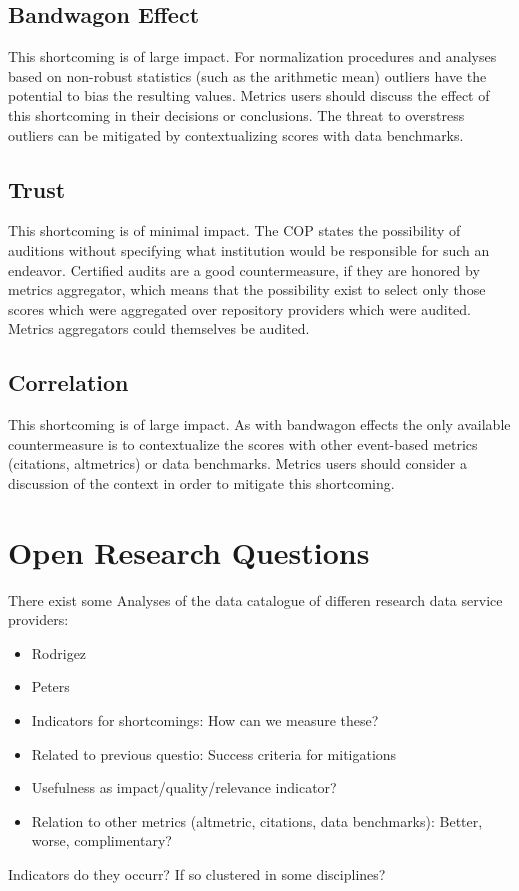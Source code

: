 \documentclass[conference, a4paper]{IEEEtran}\usepackage[]{graphicx}\usepackage[]{color}
\begin{document}
\subsection{Bandwagon Effect}
This shortcoming is of large impact.
For normalization procedures and analyses based on non-robust statistics
(such as the arithmetic mean) outliers have the potential to bias the resulting values.
Metrics users should discuss the effect of this shortcoming in their decisions or
conclusions.
The threat to overstress outliers can be mitigated by contextualizing scores
with data benchmarks.

\subsection{Trust}
This shortcoming is of minimal impact.
The COP states the possibility of auditions without specifying what institution would be
responsible for such an endeavor.
Certified audits are a good countermeasure, if they are honored by metrics aggregator,
which means that the possibility exist to select only those scores which were aggregated
over repository providers which were audited.
Metrics aggregators could themselves be audited.

\subsection{Correlation}
This shortcoming is of large impact.
As with bandwagon effects the only available countermeasure is to contextualize the scores
with other event-based metrics (citations, altmetrics) or data benchmarks.
Metrics users should consider a discussion of the context in order to mitigate this shortcoming.

\section{Open Research Questions}\label{sec:questions}

There exist some Analyses of the data catalogue of differen research data service providers:
\begin{itemize}
        \item Rodrigez
        \item Peters
\end{itemize}

\begin{itemize}
        \item Indicators for shortcomings: How can we measure these?
        \item Related to previous questio: Success criteria for mitigations
        \item Usefulness as impact/quality/relevance indicator?
        \item Relation to other metrics (altmetric, citations, data benchmarks):
            Better, worse, complimentary?
\end{itemize}
Indicators do they occurr? If so clustered in some disciplines?
\end{document}
